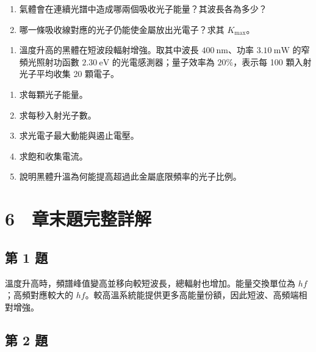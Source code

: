 \documentclass[11pt,a4paper]{article}
\providecommand{\tightlist}{%
  \setlength{\itemsep}{0pt}\setlength{\parskip}{0pt}}
\begin{document}
\begin{enumerate}
\def\labelenumi{(\arabic{enumi})}
\tightlist
\item
  氣體會在連續光譜中造成哪兩個吸收光子能量？其波長各為多少？\\
\item
  哪一條吸收線對應的光子仍能使金屬放出光電子？求其 \(K_{\max}\)。
\end{enumerate}

\begin{enumerate}
\def\labelenumi{\arabic{enumi}.}
\setcounter{enumi}{15}
\tightlist
\item
  溫度升高的黑體在短波段輻射增強。取其中波長 \(400\ \mathrm{nm}\)、功率 \(3.10\ \mathrm{mW}\) 的窄頻光照射功函數 \(2.30\ \mathrm{eV}\) 的光電感測器；量子效率為 \(20\%\)，表示每 100 顆入射光子平均收集 20 顆電子。
\end{enumerate}

\begin{enumerate}
\def\labelenumi{(\arabic{enumi})}
\tightlist
\item
  求每顆光子能量。\\
\item
  求每秒入射光子數。\\
\item
  求光電子最大動能與遏止電壓。\\
\item
  求飽和收集電流。\\
\item
  說明黑體升溫為何能提高超過此金屬底限頻率的光子比例。
\end{enumerate}

\section{6　章末題完整詳解}\label{ux7ae0ux672bux984cux5b8cux6574ux8a73ux89e3}

\subsection{第 1 題}\label{ux7b2c-1-ux984c}

溫度升高時，頻譜峰值變高並移向較短波長，總輻射也增加。能量交換單位為 \(hf\)；高頻對應較大的 \(hf\)。較高溫系統能提供更多高能量份額，因此短波、高頻端相對增強。

\subsection{第 2 題}\label{ux7b2c-2-ux984c}
\end{document}
